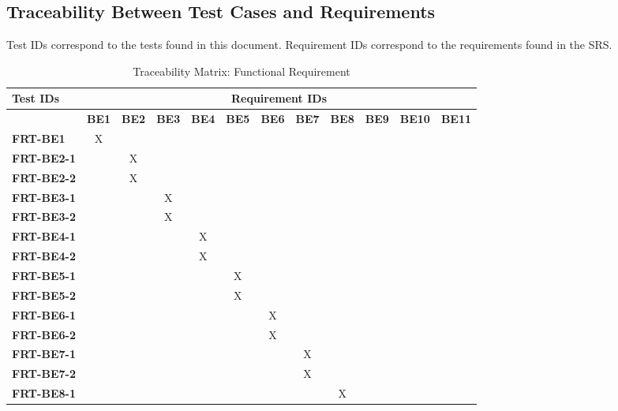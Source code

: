 \documentclass[12pt, titlepage]{article}
\begin{document}
\newpage
\begin{landscape}
\subsection{Traceability Between Test Cases and Requirements}
\noindent Test IDs correspond to the tests found in this document. Requirement IDs correspond to the requirements found in the SRS.

\begin{table}[H]
    \centering
    \caption{Traceability Matrix: Functional Requirement}
    \begin{tabular}{l|ccccccccccc}
        \textbf{Test IDs} & \multicolumn{11}{c}{\textbf{Requirement IDs}}\\
        \hline
        ~ & \textbf{BE1} & \textbf{BE2} & \textbf{BE3} & \textbf{BE4} & \textbf{BE5} & \textbf{BE6} & \textbf{BE7} & \textbf{BE8} & \textbf{BE9} & \textbf{BE10} & \textbf{BE11}\\
        \textbf{FRT-BE1}    & X & ~ & ~ & ~ & ~ & ~ & ~ & ~ & ~ & ~ & ~\\
        \textbf{FRT-BE2-1}  & ~ & X & ~ & ~ & ~ & ~ & ~ & ~ & ~ & ~ & ~\\
        \textbf{FRT-BE2-2}  & ~ & X & ~ & ~ & ~ & ~ & ~ & ~ & ~ & ~ & ~\\
        \textbf{FRT-BE3-1}  & ~ & ~ & X & ~ & ~ & ~ & ~ & ~ & ~ & ~ & ~\\
        \textbf{FRT-BE3-2}  & ~ & ~ & X & ~ & ~ & ~ & ~ & ~ & ~ & ~ & ~\\
        \textbf{FRT-BE4-1}  & ~ & ~ & ~ & X & ~ & ~ & ~ & ~ & ~ & ~ & ~\\
        \textbf{FRT-BE4-2}  & ~ & ~ & ~ & X & ~ & ~ & ~ & ~ & ~ & ~ & ~\\
        \textbf{FRT-BE5-1}  & ~ & ~ & ~ & ~ & X & ~ & ~ & ~ & ~ & ~ & ~\\
        \textbf{FRT-BE5-2}  & ~ & ~ & ~ & ~ & X & ~ & ~ & ~ & ~ & ~ & ~\\
        \textbf{FRT-BE6-1}  & ~ & ~ & ~ & ~ & ~ & X & ~ & ~ & ~ & ~ & ~\\
        \textbf{FRT-BE6-2}  & ~ & ~ & ~ & ~ & ~ & X & ~ & ~ & ~ & ~ & ~\\
        \textbf{FRT-BE7-1}  & ~ & ~ & ~ & ~ & ~ & ~ & X & ~ & ~ & ~ & ~\\
        \textbf{FRT-BE7-2}  & ~ & ~ & ~ & ~ & ~ & ~ & X & ~ & ~ & ~ & ~\\
        \textbf{FRT-BE8-1}  & ~ & ~ & ~ & ~ & ~ & ~ & ~ & X & ~ & ~ & ~\\

\end{tabular}
\end{table}
\end{landscape}
\end{document}
